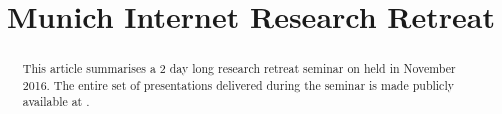 \documentclass{sigcomm-alternate}
\begin{document}
\title{Munich Internet Research Retreat}


\maketitle

\begin{abstract}

This article summarises a 2 day long research retreat seminar on  held in
November 2016.  The entire set of presentations delivered during the seminar
is made publicly available at \cite{dagstuhl-materials}.

\end{abstract}
\end{document}
